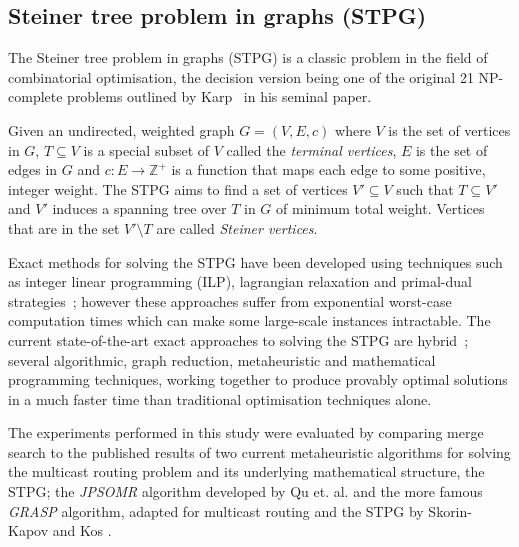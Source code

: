 \documentclass[journal]{IEEEtran}
\begin{document}
\subsection{Steiner tree problem in graphs (STPG)}

The Steiner tree problem in graphs (STPG) is a classic problem in the field of combinatorial optimisation, the decision version being one of the original 21 NP-complete problems outlined by Karp~\cite{np:karp} in his seminal paper.

Given an undirected, weighted graph $G = (V,E,c)$ where $V$ is the set of vertices in $G$, $T \subseteq V$ is a special subset of $V$ called the \emph{terminal vertices}, $E$ is the set of edges in $G$ and $c : E \to \mathbb{Z^+}$ is a function that maps each edge to some positive, integer weight. The STPG aims to find a set of vertices $V' \subseteq V$ such that $T \subseteq V'$ and $V'$ induces a spanning tree over $T$ in $G$ of minimum total weight. Vertices that are in the set $V' \setminus T$ are called \emph{Steiner vertices}.


Exact methods for solving the STPG have been developed using techniques such as integer linear programming (ILP), lagrangian relaxation and primal-dual strategies~\cite{pd:polzin}; however these approaches suffer from exponential worst-case computation times which can make some large-scale instances intractable. The current state-of-the-art exact approaches to solving the STPG are hybrid~\cite{algo:polzin,algo:daneshmand}; several algorithmic, graph reduction, metaheuristic and mathematical programming techniques, working together to produce provably optimal solutions in a much faster time than traditional optimisation techniques alone.



The experiments performed in this study were evaluated by comparing merge search to the published results of two current metaheuristic algorithms for solving the multicast routing problem and its underlying mathematical structure, the STPG; the \emph{JPSOMR} algorithm developed by Qu et. al. \cite{jpsomr:qu} and the more famous \emph{GRASP} algorithm, adapted for multicast routing and the STPG by Skorin-Kapov and Kos \cite{grasp:skorin}.
\end{document}
